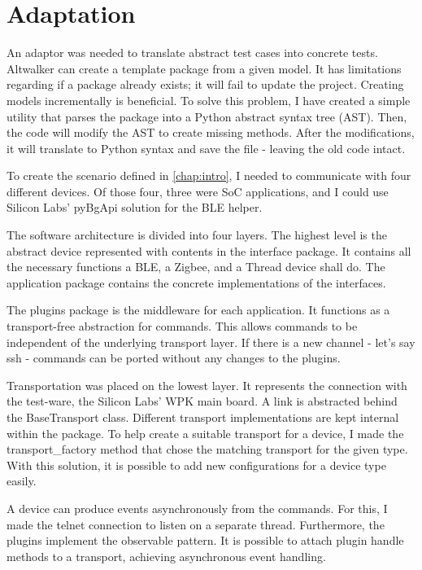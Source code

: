 \section{Adaptation}
\label{sec:meth:ada}

An adaptor was needed to translate abstract test cases into concrete tests. Altwalker can create a template package from a given model. It has limitations regarding if a package already exists; it will fail to update the project. Creating models incrementally is beneficial. To solve this problem, I have created a simple utility that parses the package into a Python abstract syntax tree (AST). Then, the code will modify the AST to create missing methods. After the modifications, it will translate to Python syntax and save the file - leaving the old code intact.

To create the scenario defined in \autoref{chap:intro}, I needed to communicate with four different devices. Of those four, three were SoC applications, and I could use Silicon Labs' pyBgApi solution for the BLE helper.

The software architecture is divided into four layers. The highest level is the abstract device represented with contents in the interface package. It contains all the necessary functions a BLE, a Zigbee, and a Thread device shall do. The application package contains the concrete implementations of the interfaces.

The plugins package is the middleware for each application. It functions as a transport-free abstraction for commands. This allows commands to be independent of the underlying transport layer. If there is a new channel - let's say ssh - commands can be ported without any changes to the plugins.

Transportation was placed on the lowest layer. It represents the connection with the test-ware, the Silicon Labs' WPK main board. A link is abstracted behind the BaseTransport class. Different transport implementations are kept internal within the package. To help create a suitable transport for a device, I made the transport\_factory method that chose the matching transport for the given type. With this solution, it is possible to add new configurations for a device type easily.

A device can produce events asynchronously from the commands. For this, I made the telnet connection to listen on a separate thread. Furthermore, the plugins implement the observable pattern. It is possible to attach plugin handle methods to a transport, achieving asynchronous event handling.

